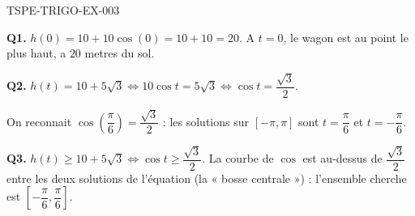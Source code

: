 \begin{corrige}{TSPE-TRIGO-EX-003}

\textbf{Q1.} $h(0) = 10 + 10\cos(0) = 10+10 = 20$. A $t=0$, le wagon est au point le plus haut, a $20$ metres du sol.

\textbf{Q2.} $h(t) = 10+5\sqrt{3} \iff 10\cos t = 5\sqrt{3} \iff \cos t = \dfrac{\sqrt{3}}{2}$.

On reconnait $\cos\!\left(\dfrac{\pi}{6}\right) = \dfrac{\sqrt{3}}{2}$ : les solutions sur $[-\pi,\pi]$ sont $t = \dfrac{\pi}{6}$ et $t = -\dfrac{\pi}{6}$.

\textbf{Q3.} $h(t) \geq 10+5\sqrt{3} \iff \cos t \geq \dfrac{\sqrt{3}}{2}$. La courbe de $\cos$ est au-dessus de $\dfrac{\sqrt{3}}{2}$ entre les deux solutions de l'équation (la « bosse centrale ») : l'ensemble cherche est $\boxed{\left[-\dfrac{\pi}{6}, \dfrac{\pi}{6}\right]}$.

\end{corrige}

